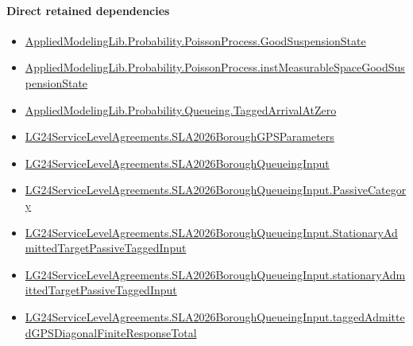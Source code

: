 \documentclass[10pt]{article}
\begin{document}
\paragraph{Direct retained dependencies}
\begin{itemize}\raggedright
\item \hyperlink{governing-declaration-ab1cfe37ad8c32b0}{Applied\allowbreak{}Modeling\allowbreak{}Lib.\allowbreak{}Probability.\allowbreak{}Poisson\allowbreak{}Process.\allowbreak{}Good\allowbreak{}Suspension\allowbreak{}State}
\item \hyperlink{governing-declaration-a8385d799d0a4d16}{Applied\allowbreak{}Modeling\allowbreak{}Lib.\allowbreak{}Probability.\allowbreak{}Poisson\allowbreak{}Process.\allowbreak{}inst\allowbreak{}Measurable\allowbreak{}Space\allowbreak{}Good\allowbreak{}Suspension\allowbreak{}State}
\item \hyperlink{governing-declaration-a69bedb5b0d420c6}{Applied\allowbreak{}Modeling\allowbreak{}Lib.\allowbreak{}Probability.\allowbreak{}Queueing.\allowbreak{}Tagged\allowbreak{}Arrival\allowbreak{}At\allowbreak{}Zero}
\item \hyperlink{governing-declaration-e9a32ba0a8f4decc}{LG24\allowbreak{}Service\allowbreak{}Level\allowbreak{}Agreements.\allowbreak{}SLA2026\allowbreak{}Borough\allowbreak{}GPS\allowbreak{}Parameters}
\item \hyperlink{governing-declaration-3e29dad51cd2861a}{LG24\allowbreak{}Service\allowbreak{}Level\allowbreak{}Agreements.\allowbreak{}SLA2026\allowbreak{}Borough\allowbreak{}Queueing\allowbreak{}Input}
\item \hyperlink{governing-declaration-abc91e26948cf0a3}{LG24\allowbreak{}Service\allowbreak{}Level\allowbreak{}Agreements.\allowbreak{}SLA2026\allowbreak{}Borough\allowbreak{}Queueing\allowbreak{}Input.\allowbreak{}Passive\allowbreak{}Category}
\item \hyperlink{governing-declaration-8796a25a610eaea9}{LG24\allowbreak{}Service\allowbreak{}Level\allowbreak{}Agreements.\allowbreak{}SLA2026\allowbreak{}Borough\allowbreak{}Queueing\allowbreak{}Input.\allowbreak{}Stationary\allowbreak{}Admitted\allowbreak{}Target\allowbreak{}Passive\allowbreak{}Tagged\allowbreak{}Input}
\item \hyperlink{governing-declaration-959c2ba9ad86ea2b}{LG24\allowbreak{}Service\allowbreak{}Level\allowbreak{}Agreements.\allowbreak{}SLA2026\allowbreak{}Borough\allowbreak{}Queueing\allowbreak{}Input.\allowbreak{}stationary\allowbreak{}Admitted\allowbreak{}Target\allowbreak{}Passive\allowbreak{}Tagged\allowbreak{}Input}
\item \hyperlink{governing-declaration-4f104ceacdba01dd}{LG24\allowbreak{}Service\allowbreak{}Level\allowbreak{}Agreements.\allowbreak{}SLA2026\allowbreak{}Borough\allowbreak{}Queueing\allowbreak{}Input.\allowbreak{}tagged\allowbreak{}Admitted\allowbreak{}GPS\allowbreak{}Diagonal\allowbreak{}Finite\allowbreak{}Response\allowbreak{}Total}
\end{itemize}
\hypertarget{governing-declaration-badb1618358c2b22}{}
\end{document}
